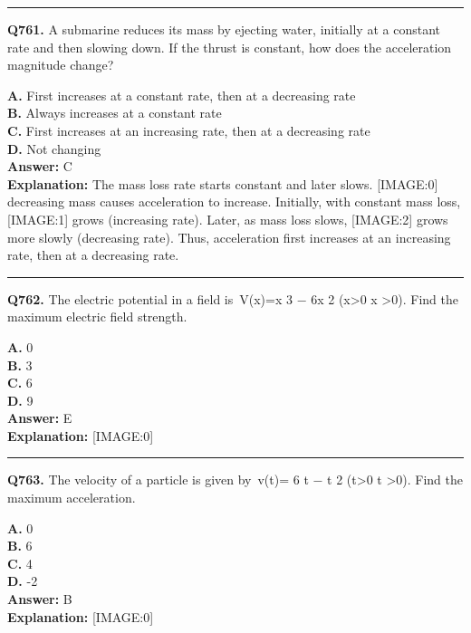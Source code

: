 \documentclass[12pt]{article}
\begin{document}
\hrule
\vspace{1em}


\noindent
\textbf{Q761.} A submarine reduces its mass by ejecting water, initially at a constant rate and then slowing down. If the thrust is constant, how does the acceleration magnitude change?



\textbf{A.} First increases at a constant rate, then at a decreasing rate \\
\textbf{B.} Always increases at a constant rate \\
\textbf{C.} First increases at an increasing rate, then at a decreasing rate \\
\textbf{D.} Not changing \\

\textbf{Answer:} C \\
\textbf{Explanation:} The mass loss rate starts constant and later slows.
[IMAGE:0]
decreasing mass causes acceleration to increase. Initially, with constant mass loss,
[IMAGE:1]
grows (increasing rate). Later, as mass loss slows,
[IMAGE:2]
grows more slowly (decreasing rate). Thus, acceleration first increases at an increasing rate, then at a decreasing rate.

\hrule
\vspace{1em}


\noindent
\textbf{Q762.} The electric potential in a field is V(x)=x
3
−
6x
2
(x>0
x
>0). Find the maximum electric field strength.



\textbf{A.} 0 \\
\textbf{B.} 3 \\
\textbf{C.} 6 \\
\textbf{D.} 9 \\

\textbf{Answer:} E \\
\textbf{Explanation:} [IMAGE:0]

\hrule
\vspace{1em}


\noindent
\textbf{Q763.} The velocity of a particle is given by v(t)=
6
t
−
t
2
(t>0
t
>0). Find the maximum acceleration.



\textbf{A.} 0 \\
\textbf{B.} 6 \\
\textbf{C.} 4 \\
\textbf{D.} -2 \\

\textbf{Answer:} B \\
\textbf{Explanation:} [IMAGE:0]
\end{document}
